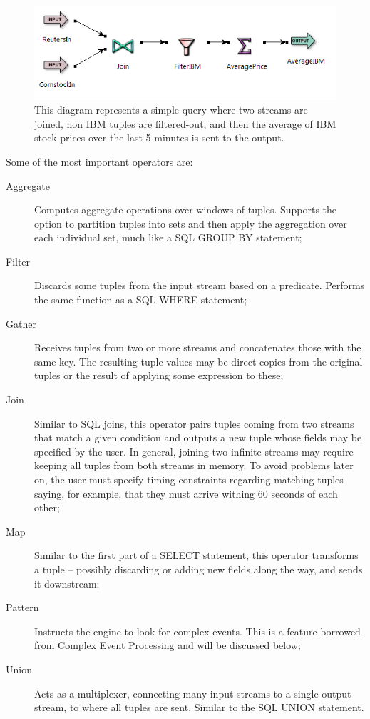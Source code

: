 \documentclass{report}
\begin{document}
\begin{figure}[htbp]
  \centering
  \includegraphics[width=\textwidth]{eventflow.png}
  \caption{This diagram represents a simple query where two streams
    are joined, non IBM tuples are filtered-out, and then the average
    of IBM stock prices over the last 5 minutes is sent to the
    output.}
  \label{fig:eventflow-sample}
\end{figure}

Some of the most important operators are:

\begin{description}
\item [Aggregate] Computes aggregate operations over windows of
  tuples. Supports the option to partition tuples into sets and then
  apply the aggregation over each individual set, much like a SQL
  GROUP BY statement;
\item [Filter] Discards some tuples from the input stream based on a
  predicate. Performs the same function as a SQL WHERE statement;
\item [Gather] Receives tuples from two or more streams and
  concatenates those with the same key. The resulting tuple values may
  be direct copies from the original tuples or the result of applying
  some expression to these;
\item [Join] Similar to SQL joins, this operator pairs tuples coming
  from two streams that match a given condition and outputs a new
  tuple whose fields may be specified by the user. In general, joining
  two infinite streams may require keeping all tuples from both
  streams in memory. To avoid problems later on, the user must specify
  timing constraints regarding matching tuples saying, for example,
  that they must arrive withing 60 seconds of each other;
\item [Map] Similar to the first part of a SELECT statement, this
  operator transforms a tuple -- possibly discarding or adding new
  fields along the way, and sends it downstream;
\item [Pattern] Instructs the engine to look for complex events. This
  is a feature borrowed from Complex Event Processing and will be
  discussed below;
\item [Union] Acts as a multiplexer, connecting many input streams to
  a single output stream, to where all tuples are sent. Similar to the
  SQL UNION statement.
\end{description}
\end{document}
